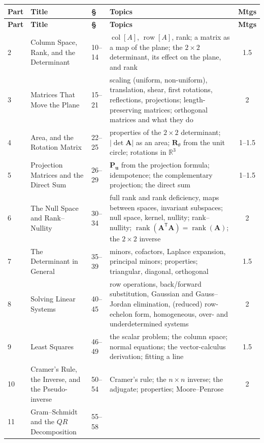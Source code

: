 \documentclass[11pt]{article}
\newcommand{\R}{\mathbb{R}}
\newcommand{\vc}[1]{\mathbf{#1}}
\newcommand{\mt}[1]{\mathbf{#1}}
\newcommand{\T}{^{\mathsf{T}}}
\newcommand{\colsp}[1]{\operatorname{col}[#1]}
\newcommand{\rowsp}[1]{\operatorname{row}[#1]}
\DeclareMathOperator{\rank}{rank}
\begin{document}
\medskip
{\renewcommand{\arraystretch}{1.3}
\small
\begin{longtable}{@{}l p{4.3cm} l p{6.4cm} c@{}}
\toprule
\textbf{Part} & \textbf{Title} & \textbf{\S} & \textbf{Topics} & \textbf{Mtgs} \\
\midrule
\endfirsthead
\toprule
\textbf{Part} & \textbf{Title} & \textbf{\S} & \textbf{Topics} & \textbf{Mtgs} \\
\midrule
\endhead
2  & Column Space, Rank, and the Determinant & 10--14 &
     $\colsp{A}$, $\rowsp{A}$, rank; a matrix as a map of the plane; the
     $2\times2$ determinant, its effect on the plane, and rank & 1.5 \\
3  & Matrices That Move the Plane & 15--21 &
     scaling (uniform, non-uniform), translation, shear, first rotations,
     reflections, projections; length-preserving matrices; orthogonal
     matrices and what they do & 2 \\
4  & Area, and the Rotation Matrix & 22--25 &
     properties of the $2\times2$ determinant; $|\det\mt{A}|$ as an area;
     $\mt{R}_\theta$ from the unit circle; rotations in $\R^{3}$ & 1--1.5 \\
5  & Projection Matrices and the Direct Sum & 26--29 &
     $\mt{P}_{\vc{u}}$ from the projection formula; idempotence; the
     complementary projection; the direct sum & 1--1.5 \\
6  & The Null Space and Rank--Nullity & 30--34 &
     full rank and rank deficiency, maps between spaces, invariant subspaces;
     null space, kernel, nullity; rank--nullity;
     $\rank(\mt{A}\T\mt{A})=\rank(\mt{A})$; the $2\times2$ inverse & 2 \\
7  & The Determinant in General & 35--39 &
     minors, cofactors, Laplace expansion, principal minors; properties;
     triangular, diagonal, orthogonal & 1.5 \\
8  & Solving Linear Systems & 40--45 &
     row operations, back/forward substitution, Gaussian and Gauss--Jordan
     elimination, (reduced) row-echelon form, homogeneous, over- and
     underdetermined systems & 2 \\
9  & Least Squares & 46--49 &
     the scalar problem; the column space; normal equations; the
     vector-calculus derivation; fitting a line & 1.5 \\
10 & Cramer's Rule, the Inverse, and the Pseudo-inverse & 50--54 &
     Cramer's rule; the $n\times n$ inverse; the adjugate; properties;
     Moore--Penrose & 2 \\
11 & Gram--Schmidt and the $QR$ Decomposition & 55--58 &

\end{longtable}}
\end{document}
